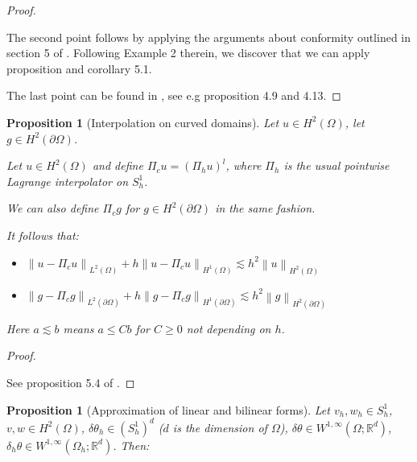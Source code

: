 \documentclass[english,a4paper,9pt,oneside]{scrbook}	%
\theoremstyle{break}
\newtheorem{prop}[equation]{Proposition}
\newenvironment{mproof}[1][\proofname]{%
  \begin{proof}[#1]$ $\par\nobreak\ignorespaces
}{%
  \end{proof}
}
\renewcommand*{\proofname}{Proof}
\theoremstyle{remark}
\newcommand{\mR}{\mathbb{R}}
\newcommand{\norm}[1]{\left\lVert#1\right\rVert}
\newcommand{\te}{\theta}
\begin{document}
\begin{appendices}
\begin{mproof}
The second point follows by applying the arguments about conformity outlined in section 5 of \cite{bernardi}. Following Example 2 therein, we discover that we can apply proposition and corollary 5.1.

The last point can be found in \cite{elliott}, see e.g proposition 4.9 and 4.13.
%
%
%
%
\end{mproof}

\begin{prop}[Interpolation on curved domains]
\label{prop:interp_curv}
Let $u \in H^2(\Omega)$, let $g \in H^2(\partial \Omega)$.

Let $u\in H^2(\Omega)$ and define $\Pi_c u = (\Pi_h u )^l$, where $\Pi_h$ is the usual pointwise Lagrange interpolator on $S^1_h$.

We can also define $\Pi_c g $ for $g \in H^2(\partial \Omega)$ in the same fashion.

It follows that:

\begin{itemize}
	\item $\norm{u-\Pi_c u}_{L^2(\Omega)} + h \norm{u-\Pi_c u}_{H^1(\Omega)}\lesssim h^2\norm{u}_{H^2(\Omega)}$
	\item $\norm{g-\Pi_c g}_{L^2(\partial \Omega)} + h \norm{g-\Pi_c g}_{H^1(\partial \Omega)}\lesssim h^2\norm{g}_{H^2(\partial \Omega)}$
\end{itemize}
Here $a \lesssim b$ means $a \leq Cb$ for $C\geq 0$ not depending on $h$.
\end{prop}

\begin{mproof}
See proposition 5.4 of \cite{elliott}.
\end{mproof}

\begin{prop}[Approximation of linear and bilinear forms]
\label{prop:lin_appr}
Let $v_h, w_h \in S^1_h$, $v,w \in H^2(\Omega)$, $\delta \te_h \in (S^1_h)^d$ ($d$ is the dimension of $\Omega$), $\delta \te \in W^{1,\infty}(\Omega;\mR^d)$, $\delta_h \te \in W^{1,\infty}(\Omega_h;\mR^d)$. Then:


\end{prop}
\end{appendices}
\end{document}
